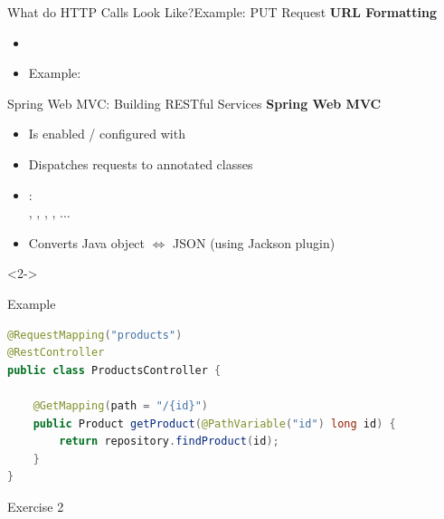 \begin{frame}{What do HTTP Calls Look Like?}{Example: PUT Request}
\vfill
\scriptsize \textbf{URL Formatting}\\
\begin{itemize} 
\item {}
\item Example: 
\end{itemize}
\end{frame}


\begin{frame}[fragile]{Spring Web MVC: Building RESTful Services}
\textbf{Spring Web MVC} 
\small
\begin{itemize}
\item Is enabled / configured with 
\item Dispatches requests to  annotated classes
\item  {}: \\, , , , ...
\item Converts Java object $\Leftrightarrow$ JSON (using Jackson plugin)
\end{itemize}
\vfill
\begin{visibleenv}<2->
\vspace{-3mm}
\begin{block}{Example}
\begin{lstlisting}[language=Java,belowskip=-3mm,aboveskip=0mm]
@RequestMapping("products")
@RestController
public class ProductsController {

    @GetMapping(path = "/{id}")
    public Product getProduct(@PathVariable("id") long id) {
        return repository.findProduct(id);
    }
}
\end{lstlisting}
\end{block}
\end{visibleenv}
\end{frame}


\begin{frame}{Exercise 2}
	\begin{figure}
	\end{figure}
\end{frame}



